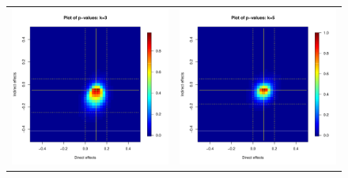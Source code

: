 \documentclass[12pt]{article}
\begin{document}
\begin{figure}
	\centering
	\begin{tabular}{cc}
	\includegraphics[scale=0.45]{./images/pval_plot_bergan_ideo_3nn_raw.pdf} &
	\includegraphics[scale=0.45]{./images/pval_plot_bergan_ideo_5nn_raw.pdf} \\ 

\end{tabular}
\end{figure}
\end{document}
